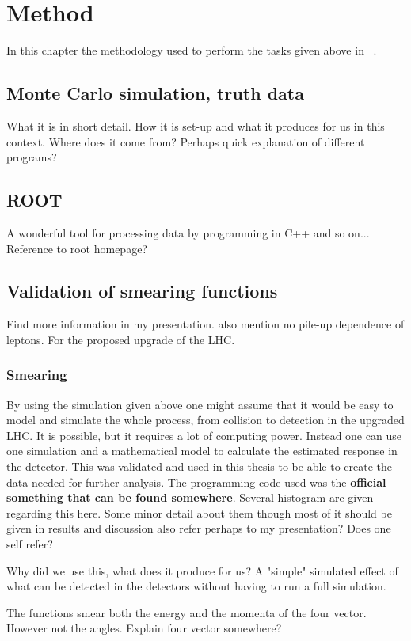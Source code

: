 \chapter{Method}\label{cha:meth}
In this chapter the methodology used to perform the tasks given above in ~.
\newpage
\section{Monte Carlo simulation, truth data}
What it is in short detail. How it is set-up and what it produces for us in this context. 
Where does it come from? Perhaps quick explanation of different programs?
\section{ROOT}
A wonderful tool for processing data by programming in C++ and so on... Reference to root homepage?
\section{Validation of smearing functions}
Find more information in my presentation. also mention no pile-up dependence of leptons.
For the proposed upgrade of the LHC.


\subsection{Smearing}
By using the simulation given above one might assume that it would be easy to model and simulate the whole process, from collision to detection in the upgraded LHC. It is possible, but it requires a lot of computing power. Instead one can use one simulation and a mathematical model to calculate the estimated response in the detector. This was validated and used in this thesis to be able to create the data needed for further analysis. The programming code used was the \textbf{official something that can be found somewhere}. 
Several histogram are given regarding this here. Some minor detail about them though most of it should be given in results and discussion also refer perhaps to my presentation? Does one self refer?


Why did we use this, what does it produce for us? A "simple" simulated effect of what can be detected in the detectors without having to run a full simulation. 

The functions smear both the energy and the momenta of the four vector. However not the angles. Explain four vector somewhere?

